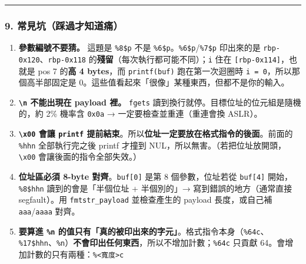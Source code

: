 \documentclass[10pt,a4paper]{article}
\providecommand{\tightlist}{%
  \setlength{\itemsep}{0pt}\setlength{\parskip}{0pt}}
\begin{document}
\begin{center}\rule{0.5\linewidth}{0.5pt}\end{center}

\subsubsection{9.
常見坑（踩過才知道痛）}\label{ux5e38ux898bux5751ux8e29ux904eux624dux77e5ux9053ux75db}

\begin{enumerate}
\def\labelenumi{\arabic{enumi}.}
\tightlist
\item
  \textbf{參數編號不要猜。} 這題是 \texttt{\%\allowbreak{}8\$\allowbreak{}p} 不是
  \texttt{\%\allowbreak{}6\$\allowbreak{}p}。\texttt{\%\allowbreak{}6\$\allowbreak{}p}/\texttt{\%\allowbreak{}7\$\allowbreak{}p} 印出來的是
  \texttt{rbp-\allowbreak{}0x120}、\texttt{rbp-\allowbreak{}0x118}
  的\textbf{殘留}（每次執行都可能不同）；\texttt{i} 住在
  \texttt{{[}rbp-\allowbreak{}0x114{]}}，也就是 pos 7 的\textbf{高 4 bytes}，而
  \texttt{printf(buf)} 跑在第一次迴圈時
  \texttt{i\ \allowbreak{}=\ \allowbreak{}0}，所以那個高半部固定是
  0。這些值看起來「很像」某種東西，但都不是你的輸入。
\item
  \textbf{\texttt{\textbackslash{}\allowbreak{}n} 不能出現在 payload 裡。}
  \texttt{fgets} 讀到換行就停。目標位址的位元組是隨機的，約 2\% 機率含
  \texttt{0x0a} → 一定要檢查並重連（重連會換 ASLR）。
\item
  \textbf{\texttt{\textbackslash{}\allowbreak{}x00} 會讓 \texttt{printf}
  提前結束}。所以\textbf{位址一定要放在格式指令的後面}。前面的
  \texttt{\%\allowbreak{}hhn} 全部執行完之後 printf 才撞到
  NUL，所以無害。（若把位址放開頭，\texttt{\textbackslash{}\allowbreak{}x00}
  會讓後面的指令全部失效。）
\item
  \textbf{位址區必須 8-byte 對齊}。\texttt{buf{[}0{]}} 是第 8
  個參數，位址若從 \texttt{buf{[}4{]}} 開始，\texttt{\%\allowbreak{}8\$\allowbreak{}hhn}
  讀到的會是「半個位址 + 半個別的」→ 寫到錯誤的地方（通常直接
  segfault）。用 \texttt{fmtstr\_\allowbreak{}payload} 並檢查產生的 payload
  長度，或自己補 \texttt{aaa}/\texttt{aaaa} 對齊。
\item
  \textbf{要算進 \texttt{\%\allowbreak{}n}
  的值只有「真的被印出來的字元」}。格式指令本身（\texttt{\%\allowbreak{}64c}、\texttt{\%\allowbreak{}17\$\allowbreak{}hhn}、\texttt{\%\allowbreak{}n}）\textbf{不會印出任何東西}，所以不增加計數；\texttt{\%\allowbreak{}64c}
  只貢獻
  64。會增加計數的只有兩種：\texttt{\%\allowbreak{}\textless{}\allowbreak{}寬度\textgreater{}\allowbreak{}c}

\end{enumerate}
\end{document}
